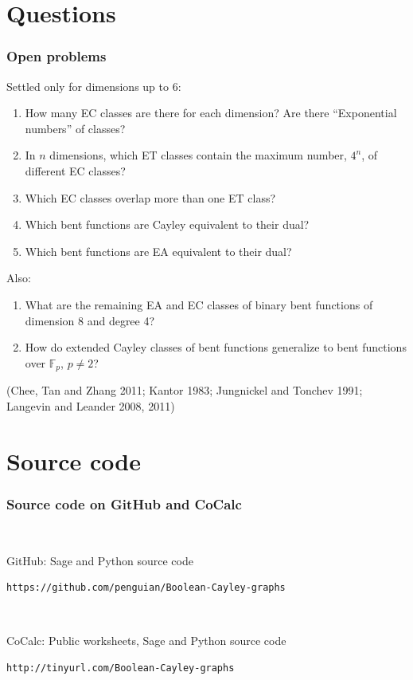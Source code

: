 \documentclass[pdf,sprung,slideColor,nocolorBG]{beamer}
\newenvironment{colortheme}[1]{
\def\ProvidesPackageRCS $##1${\relax}
\renewcommand{\ProcessOptions}{\relax}
\makeatletter

\makeatother
}{}
\newcommand{\slidecite}[1]{\tiny{(#1)}\normalsize{}}
\newcommand{\mb}[1]{\mathbb{#1}}
\newcommand{\F}{\mb{F}}
\begin{document}
\begin{colortheme}{jubata}
\section{Questions}
\begin{frame}
\frametitle{Open problems}
Settled only for dimensions up to 6:
\begin{enumerate}
\item
How many EC classes are there for each dimension?
Are there ``Exponential numbers'' of classes?
\item
In $n$ dimensions,
which ET classes contain the maximum number, $4^n$, of different EC classes?
\item
Which EC classes overlap more than one ET class?
\item
Which bent functions are Cayley equivalent to their dual?
\item
Which bent functions are EA equivalent to their dual?
\end{enumerate}
Also:
\begin{enumerate}
\item
What are the remaining EA and EC classes of binary bent functions of dimension 8 and degree 4?
\item
How do extended Cayley classes of bent functions generalize to bent functions over $\F_p$, $p \neq 2$?
\end{enumerate}

\slidecite{Chee, Tan and Zhang 2011; Kantor 1983; Jungnickel and Tonchev 1991; Langevin and Leander 2008, 2011}
\end{frame}
\end{colortheme}
\section{Source code}
\begin{colortheme}{jubata}
\begin{frame}[fragile]
\frametitle{Source code on GitHub and CoCalc}
~

GitHub: Sage and Python source code

\begin{verbatim}
https://github.com/penguian/Boolean-Cayley-graphs
\end{verbatim}

~

CoCalc: Public worksheets, Sage and Python source code

\begin{verbatim}
http://tinyurl.com/Boolean-Cayley-graphs
\end{verbatim}

\end{frame}
\end{colortheme}
\end{document}
